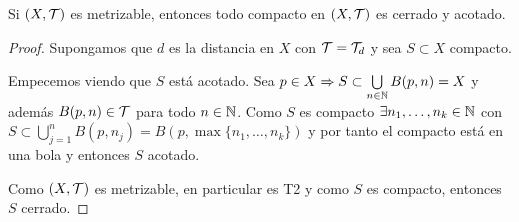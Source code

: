\begin{coro}
    Si $(X, \mathcal{T})$ es metrizable, entonces todo compacto en $(X, \mathcal{T})$ es cerrado y acotado.
    \begin{proof}
        Supongamos que $d$ es la distancia en $X$ con $\mathcal{T}=\mathcal{T}_d$ y sea $S\subset X$ compacto. 

        Empecemos viendo que $S$ está acotado. Sea $p\in X \Rightarrow S\subset \bigcup\limits_{n\in \mathbb{N}}B(p,n)=X$ y además $B(p,n)\in \mathcal{T}$ para todo $n\in \mathbb{N}$. Como $S$ es compacto $\exists n_1,\dots,n_k\in \mathbb{N}$ con $S\subset \bigcup\limits_{j=1}^n B(p,n_j) = B(p,\max\{n_1,\dots,n_k\})$ y por tanto el compacto está en una bola y entonces $S$ acotado.

        Como $(X, \mathcal{T})$ es metrizable, en particular es T2 y como $S$ es compacto, entonces $S$ cerrado.

    \end{proof}
\end{coro}

